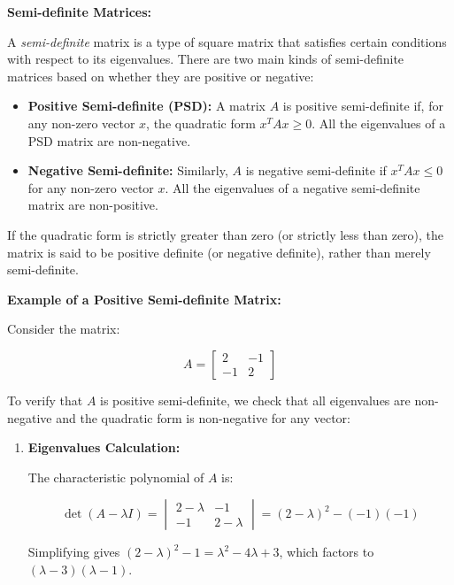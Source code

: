 \begin{airesult}
\textbf{Semi-definite Matrices:}

A \textit{semi-definite} matrix is a type of square matrix that satisfies certain conditions with
respect to its eigenvalues. There are two main kinds of semi-definite matrices based on whether they
are positive or negative:

\begin{itemize}
  \item \textbf{Positive Semi-definite (PSD):} A matrix \(A\) is positive semi-definite if, for any
non-zero vector \(x\), the quadratic form \(x^T A x \geq 0\). All the eigenvalues of a PSD matrix
are non-negative.

  \item \textbf{Negative Semi-definite:} Similarly, \(A\) is negative semi-definite if \(x^T A x
\leq 0\) for any non-zero vector \(x\). All the eigenvalues of a negative semi-definite matrix are
non-positive.
\end{itemize}

If the quadratic form is strictly greater than zero (or strictly less than zero), the matrix is said
to be positive definite (or negative definite), rather than merely semi-definite.

\vsp

\textbf{Example of a Positive Semi-definite Matrix:}

Consider the matrix:

\[
A = \begin{bmatrix}
2 & -1 \\
-1 & 2
\end{bmatrix}
\]

To verify that \(A\) is positive semi-definite, we check that all eigenvalues are non-negative and
the quadratic form is non-negative for any vector:

\begin{enumerate}
  \item \textbf{Eigenvalues Calculation:}

  The characteristic polynomial of \(A\) is:

  \[
  \det(A - \lambda I) =
  \begin{vmatrix}
  2-\lambda & -1 \\
  -1 & 2-\lambda
  \end{vmatrix}
  = (2-\lambda)^2 - (-1)(-1)
  \]

  Simplifying gives \((2-\lambda)^2 - 1 = \lambda^2 - 4\lambda + 3\), which factors to
  \((\lambda - 3)(\lambda - 1)\).


\end{enumerate}
\end{airesult}
